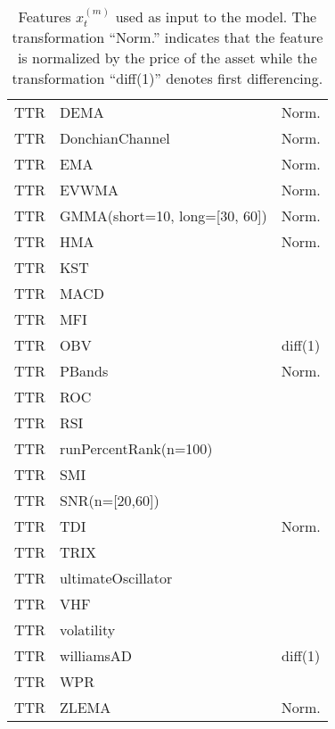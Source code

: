 \documentclass[3p,times,twocolumn]{elsarticle}
\begin{document}
\begin{table}[!htbp]
\begin{tabular}{l l c}
        TTR    & DEMA                              & Norm.          \\
        TTR    & DonchianChannel                   & Norm.          \\
        TTR    & EMA                               & Norm.          \\
        TTR    & EVWMA                             & Norm.          \\
        TTR    & GMMA(short=10, long=[30, 60])     & Norm.          \\
        TTR    & HMA                               & Norm.          \\
        TTR    & KST                               &                \\
        TTR    & MACD                              &                \\
        TTR    & MFI                               &                \\
        TTR    & OBV                               & diff(1)        \\
        TTR    & PBands                            & Norm.          \\
        TTR    & ROC                               &                \\
        TTR    & RSI                               &                \\
        TTR    & runPercentRank(n=100)             &                \\
        TTR    & SMI                               &                \\
        TTR    & SNR(n=[20,60])                    &                \\
        TTR    & TDI                               & Norm.          \\
        TTR    & TRIX                              &                \\
        TTR    & ultimateOscillator                &                \\
        TTR    & VHF                               &                \\
        TTR    & volatility                        &                \\
        TTR    & williamsAD                        & diff(1)        \\
        TTR    & WPR                               &                \\
        TTR    & ZLEMA                             & Norm.          \\
        \bottomrule
    \end{tabular}
    \caption{
        Features $x_{t}^{(m)}$ used as input to the model.
        The transformation ``Norm.'' indicates that the feature is normalized by the price of the asset while the transformation ``diff(1)'' denotes first differencing.
    } %
    \label{tab:features}
\end{table}
\end{document}
